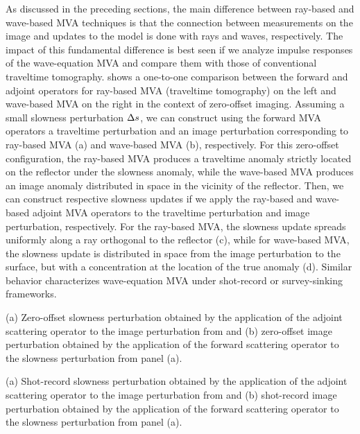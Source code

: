 As discussed in the preceding sections, the main difference between
ray-based and wave-based MVA techniques is that the connection between
measurements on the image and updates to the model is done with rays
and waves, respectively. The impact of this fundamental difference is
best seen if we analyze impulse responses of the wave-equation MVA and
compare them with those of conventional traveltime
tomography.  shows a one-to-one comparison between the
forward and adjoint operators for ray-based MVA (traveltime
tomography) on the left and wave-based MVA on the right in the
context of zero-offset imaging.
%
Assuming a small slowness perturbation $\Delta s$, we can construct using
the forward MVA operators a traveltime perturbation and an image
perturbation corresponding to ray-based MVA (a) and wave-based MVA
(b), respectively. For this zero-offset configuration, the ray-based
MVA produces a traveltime anomaly strictly located on the reflector
under the slowness anomaly, while the wave-based MVA produces an image
anomaly distributed in space in the vicinity of the reflector.
%
Then, we can construct respective slowness updates if we apply the
ray-based and wave-based adjoint MVA operators to the traveltime
perturbation and image perturbation, respectively. For the ray-based
MVA, the slowness update spreads uniformly along a ray orthogonal to
the reflector (c), while for wave-based MVA, the slowness update is
distributed in space from the image perturbation to the surface, but
with a concentration at the location of the true anomaly (d). Similar
behavior characterizes wave-equation MVA under shot-record or
survey-sinking frameworks.


 { (a) Zero-offset
slowness perturbation obtained by the application of the adjoint
scattering operator to the image perturbation from 
and (b) zero-offset image perturbation obtained by the application of
the forward scattering operator to the slowness perturbation from
panel (a).  }

 { (a) Shot-record
slowness perturbation obtained by the application of the adjoint
scattering operator to the image perturbation from 
and (b) shot-record image perturbation obtained by the application of
the forward scattering operator to the slowness perturbation from
panel (a).  }

